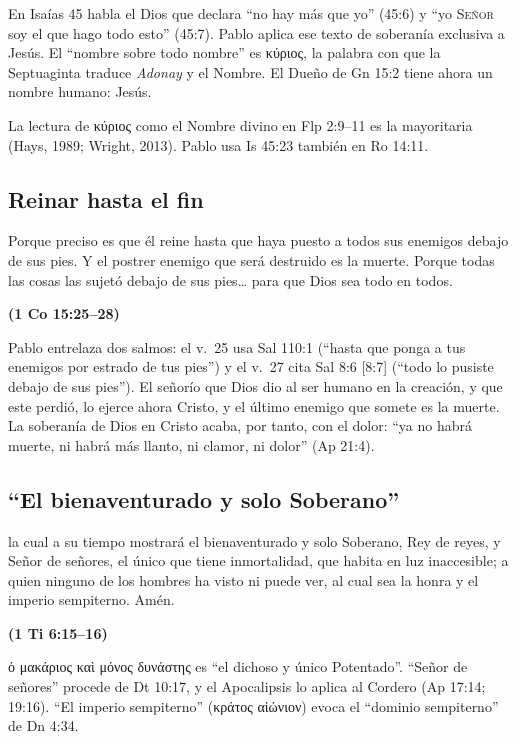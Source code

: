\documentclass[11pt,letterpaper]{article}
\newcommand{\grc}[1]{\foreignlanguage{ancientgreek}{#1}}
\newcommand{\SENOR}{\textsc{Señor}}
\newcommand{\fuente}[1]{\par\hfill{\upshape\bfseries\small\textcolor{azul}{#1}}}
\begin{document}
En Isaías 45 habla el Dios que declara ``no hay más que yo'' (45:6) y ``yo \SENOR{} soy el que hago todo esto'' (45:7). Pablo aplica ese texto de soberanía exclusiva a Jesús. El ``nombre sobre todo nombre'' es \grc{κύριος}, la palabra con que la Septuaginta traduce \emph{Adonay} y el Nombre. El Dueño de Gn 15:2 tiene ahora un nombre humano: Jesús.

\begin{nota}[Precisión]
La lectura de \grc{κύριος} como el Nombre divino en Flp 2:9--11 es la mayoritaria (Hays, 1989; Wright, 2013). Pablo usa Is 45:23 también en Ro 14:11.
\end{nota}

\subsection{Reinar hasta el fin}
\begin{cita}Porque preciso es que él reine hasta que haya puesto a todos sus enemigos debajo de sus pies. Y el postrer enemigo que será destruido es la muerte. Porque todas las cosas las sujetó debajo de sus pies\ldots{} para que Dios sea todo en todos.\fuente{(1 Co 15:25--28)}\end{cita}

Pablo entrelaza dos salmos: el v.~25 usa Sal 110:1 (``hasta que ponga a tus enemigos por estrado de tus pies'') y el v.~27 cita Sal 8:6 [8:7] (``todo lo pusiste debajo de sus pies''). El señorío que Dios dio al ser humano en la creación, y que este perdió, lo ejerce ahora Cristo, y el último enemigo que somete es la muerte. La soberanía de Dios en Cristo acaba, por tanto, con el dolor: ``ya no habrá muerte, ni habrá más llanto, ni clamor, ni dolor'' (Ap 21:4).

\subsection{``El bienaventurado y solo Soberano''}
\begin{cita}la cual a su tiempo mostrará el bienaventurado y solo Soberano, Rey de reyes, y Señor de señores, el único que tiene inmortalidad, que habita en luz inaccesible; a quien ninguno de los hombres ha visto ni puede ver, al cual sea la honra y el imperio sempiterno. Amén.\fuente{(1 Ti 6:15--16)}\end{cita}

\grc{ὁ μακάριος καὶ μόνος δυνάστης} es ``el dichoso y único Potentado''. ``Señor de señores'' procede de Dt 10:17, y el Apocalipsis lo aplica al Cordero (Ap 17:14; 19:16). ``El imperio sempiterno'' (\grc{κράτος αἰώνιον}) evoca el ``dominio sempiterno'' de Dn 4:34.
\end{document}
